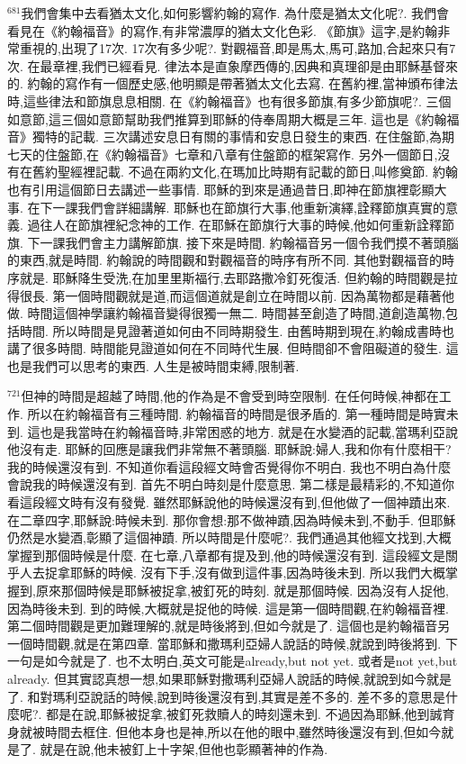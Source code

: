 \documentclass{book}
\begin{document}
$^{681}$我們會集中去看猶太文化,如何影響約翰的寫作.
為什麼是猶太文化呢?.
我們會看見在《約翰福音》的寫作,有非常濃厚的猶太文化色彩.
《節旗》這字,是約翰非常重視的,出現了17次.
17次有多少呢?.
對觀福音,即是馬太,馬可,路加,合起來只有7次.
在最章裡,我們已經看見.
律法本是直象摩西傳的,因典和真理卻是由耶穌基督來的.
約翰的寫作有一個歷史感,他明顯是帶著猶太文化去寫.
在舊約裡,當神頒布律法時,這些律法和節旗息息相關.
在《約翰福音》也有很多節旗,有多少節旗呢?.
三個如意節,這三個如意節幫助我們推算到耶穌的侍奉周期大概是三年.
這也是《約翰福音》獨特的記載.
三次講述安息日有關的事情和安息日發生的東西.
在住盤節,為期七天的住盤節,在《約翰福音》七章和八章有住盤節的框架寫作.
另外一個節日,沒有在舊約聖經裡記載.
不過在兩約文化,在瑪加比時期有記載的節日,叫修奠節.
約翰也有引用這個節日去講述一些事情.
耶穌的到來是通過昔日,即神在節旗裡彰顯大事.
在下一課我們會詳細講解.
耶穌也在節旗行大事,他重新演繹,詮釋節旗真實的意義.
過往人在節旗裡紀念神的工作.
在耶穌在節旗行大事的時候,他如何重新詮釋節旗.
下一課我們會主力講解節旗.
接下來是時間.
約翰福音另一個令我們摸不著頭腦的東西,就是時間.
約翰說的時間觀和對觀福音的時序有所不同.
其他對觀福音的時序就是.
耶穌降生受洗,在加里里斯福行,去耶路撒冷釘死復活.
但約翰的時間觀是拉得很長.
第一個時間觀就是道,而這個道就是創立在時間以前.
因為萬物都是藉著他做.
時間這個神學讓約翰福音變得很獨一無二.
時間甚至創造了時間,道創造萬物,包括時間.
所以時間是見證著道如何由不同時期發生.
由舊時期到現在,約翰成書時也講了很多時間.
時間能見證道如何在不同時代生展.
但時間卻不會阻礙道的發生.
這也是我們可以思考的東西.
人生是被時間束縛,限制著.

$^{721}$但神的時間是超越了時間,他的作為是不會受到時空限制.
在任何時候,神都在工作.
所以在約翰福音有三種時間.
約翰福音的時間是很矛盾的.
第一種時間是時實未到.
這也是我當時在約翰福音時,非常困惑的地方.
就是在水變酒的記載,當瑪利亞說他沒有走.
耶穌的回應是讓我們非常無不著頭腦.
耶穌說:婦人,我和你有什麼相干?我的時候還沒有到.
不知道你看這段經文時會否覺得你不明白.
我也不明白為什麼會說我的時候還沒有到.
首先不明白時刻是什麼意思.
第二樣是最精彩的,不知道你看這段經文時有沒有發覺.
雖然耶穌說他的時候還沒有到,但他做了一個神蹟出來.
在二章四字,耶穌說:時候未到.
那你會想:那不做神蹟,因為時候未到,不動手.
但耶穌仍然是水變酒,彰顯了這個神蹟.
所以時間是什麼呢?.
我們通過其他經文找到,大概掌握到那個時候是什麼.
在七章,八章都有提及到,他的時候還沒有到.
這段經文是關乎人去捉拿耶穌的時候.
沒有下手,沒有做到這件事,因為時後未到.
所以我們大概掌握到,原來那個時候是耶穌被捉拿,被釘死的時刻.
就是那個時候.
因為沒有人捉他,因為時後未到.
到的時候,大概就是捉他的時候.
這是第一個時間觀,在約翰福音裡.
第二個時間觀是更加難理解的,就是時後將到,但如今就是了.
這個也是約翰福音另一個時間觀,就是在第四章.
當耶穌和撒瑪利亞婦人說話的時候,就說到時後將到.
下一句是如今就是了.
也不太明白,英文可能是already,but not yet.
或者是not yet,but already.
但其實認真想一想,如果耶穌對撒瑪利亞婦人說話的時候,就說到如今就是了.
和對瑪利亞說話的時候,說到時後還沒有到,其實是差不多的.
差不多的意思是什麼呢?.
都是在說,耶穌被捉拿,被釘死救贖人的時刻還未到.
不過因為耶穌,他到誠育身就被時間去框住.
但他本身也是神,所以在他的眼中,雖然時後還沒有到,但如今就是了.
就是在說,他未被釘上十字架,但他也彰顯著神的作為.
\end{document}
